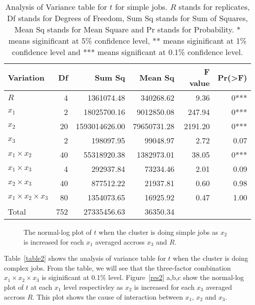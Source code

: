 \documentclass[preprint]{acm_proc_article-sp}
\begin{document}
\begin{table*}
	\caption{Analysis of Variance table for $t$ for simple jobs. $R$ stands for replicates, Df stands for Degrees of Freedom, Sum Sq stands for Sum of Squares, Mean Sq stands for Mean Square and Pr stands for Probability. * means siginificant at 5\% confidence level, ** means siginificant at 1\% confidence level and *** means significant at 0.1\% confidence level.}
	\label{table1}
	\centering
	\begin{tabular}{l|rrrrr}
		\hline\hline
		Variation&Df&Sum Sq&Mean Sq&F value&Pr(>F)\\
		\hline
		$R$&4&1361074.48&340268.62&9.36&0***\\
		$x_1$&2&18025700.16&9012850.08&247.94&0***\\
		$x_2$&20&1593014626.00&79650731.28&2191.20&0***\\
		$x_3$&2&198097.95&99048.97&2.72&0.07\\
		$x_1 \times x_2$&40&55318920.38&1382973.01&38.05&0***\\
		$x_1 \times x_3$&4&292937.84&73234.46&2.01&0.09\\
		$x_2 \times x_3$&40&877512.22&21937.81&0.60&0.98\\
		$x_1 \times x_2 \times x_3$&80&1354073.65&16925.92&0.47&1.00\\
		\hline
		Total&752&27335456.63&36350.34\\
		\hline\hline
	\end{tabular}
\end{table*}

\begin{figure*}[htb]
        \centering
{}
        \caption{The normal-log plot of $t$ when the cluster is doing simple jobs as $x_2$ is increased for each $x_1$ averaged accross $x_3$ and $R$.}
        \label{res1}
\end{figure*}


Table~\ref{table2} shows the analysis of variance table for $t$ when the cluster is doing complex jobs. From the table, we will see that the three-factor combination $x_1 \times x_2 \times x_3$ is siginificant at 0.1\% level. Figure~\ref{res2} a,b,c show the normal-log plot of $t$ at each $x_1$ level respectivley as $x_2$ is increased for each $x_3$ averaged accross $R$. This plot shows the cause of interaction between $x_1$, $x_2$ and $x_3$.
\end{document}

